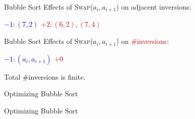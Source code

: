 \begin{frame}{Bubble Sort}
  Effects of \textsc{Swap}{($a_{i}, a_{i+1}$)} on adjacent inversions:

  \pause
  \begin{center}
	\textcolor{blue}{$-1: (7,2)$} \pause \qquad\qquad \textcolor{red}{$+2: (6,2), (7,4)$}
  \end{center}
\end{frame}
\begin{frame}{Bubble Sort}
  Effects of \textsc{Swap}{($a_{i}, a_{i+1}$)} on \textcolor{red}{\#inversions}:

  \pause
  \begin{center}
	\textcolor{blue}{$-1: (a_{i},a_{i+1})$} \pause \qquad\qquad \textcolor{red}{$+0$}
  \end{center}

  \pause
  \vspace{0.20cm}

  \begin{center}
	Total \#inversions is finite.
  \end{center}
\end{frame}
\begin{frame}{Optimizing Bubble Sort}
  
\end{frame}
\begin{frame}{Optimizing Bubble Sort}
  
\end{frame}

